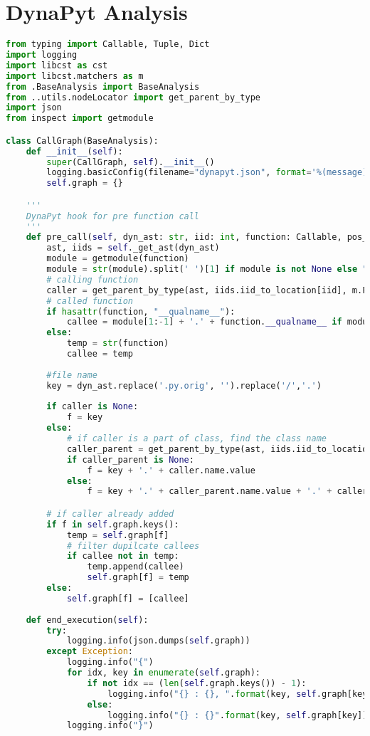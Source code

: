 \section{DynaPyt Analysis}
\lstset{numbers=left, numberstyle=\tiny, stepnumber=1, numbersep=5pt, columns=flexible, breaklines=true, numberblanklines=false}
\lstset{basicstyle=\ttfamily}
\lstset{frame=tb}

\begin{lstlisting}[caption=Call Graph Analysis in DynaPyt,label=code:CallGraphAnalysis,language=Python]
from typing import Callable, Tuple, Dict
import logging
import libcst as cst
import libcst.matchers as m
from .BaseAnalysis import BaseAnalysis
from ..utils.nodeLocator import get_parent_by_type
import json
from inspect import getmodule

class CallGraph(BaseAnalysis):
    def __init__(self):
        super(CallGraph, self).__init__()
        logging.basicConfig(filename="dynapyt.json", format='%(message)s', level=logging.INFO)
        self.graph = {}

    '''
    DynaPyt hook for pre function call
    '''
    def pre_call(self, dyn_ast: str, iid: int, function: Callable, pos_args: Tuple, kw_args: Dict):
        ast, iids = self._get_ast(dyn_ast)
        module = getmodule(function)
        module = str(module).split(' ')[1] if module is not None else "''"
        # calling function 
        caller = get_parent_by_type(ast, iids.iid_to_location[iid], m.FunctionDef())
        # called function
        if hasattr(function, "__qualname__"):
            callee = module[1:-1] + '.' + function.__qualname__ if module != "''" else function.__qualname__
        else:
            temp = str(function)
            callee = temp
        
        #file name
        key = dyn_ast.replace('.py.orig', '').replace('/','.')
        
        if caller is None:
            f = key
        else:
            # if caller is a part of class, find the class name
            caller_parent = get_parent_by_type(ast, iids.iid_to_location[iid], m.ClassDef())
            if caller_parent is None:
                f = key + '.' + caller.name.value
            else:
                f = key + '.' + caller_parent.name.value + '.' + caller.name.value

        # if caller already added
        if f in self.graph.keys():
            temp = self.graph[f]
            # filter dupilcate callees
            if callee not in temp:
                temp.append(callee)
                self.graph[f] = temp
        else:
            self.graph[f] = [callee]
    
    def end_execution(self):
        try:
            logging.info(json.dumps(self.graph))
        except Exception:
            logging.info("{")
            for idx, key in enumerate(self.graph):                
                if not idx == (len(self.graph.keys()) - 1):
                    logging.info("{} : {}, ".format(key, self.graph[key]))
                else:
                    logging.info("{} : {}".format(key, self.graph[key]))
            logging.info("}")
                
\end{lstlisting}